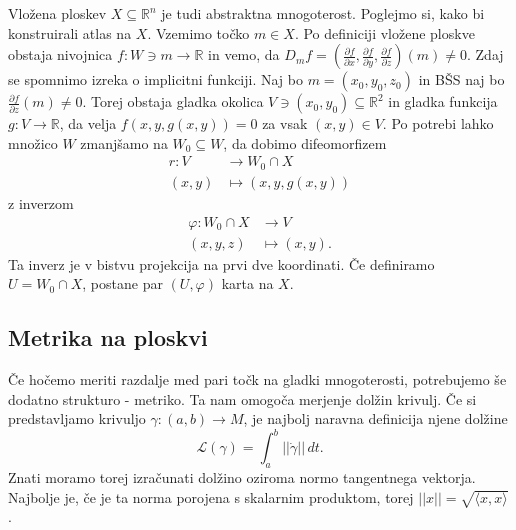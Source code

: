 \documentclass[10pt, a4paper]{article}
\begin{document}
Vložena ploskev $X \subseteq  \mathbb{R}^n$ je tudi abstraktna mnogoterost. Poglejmo si, kako bi konstruirali atlas na $X$. Vzemimo točko $m \in  X$. Po definiciji vložene ploskve obstaja nivojnica $f: W \ni m \to \mathbb{R}$ in vemo, da $D_mf = \left( \frac{ \partial f }{ \partial x } , \frac{ \partial f }{ \partial y }  , \frac{ \partial f }{ \partial z }  \right)\left( m \right) \neq 0$. Zdaj se spomnimo izreka o implicitni funkciji. Naj bo $m = \left( x_0, y_0 , z_0 \right)$ in BŠS naj bo $\frac{ \partial f }{ \partial z }\left( m \right) \neq 0$. Torej obstaja gladka okolica $V \ni \left( x_0, y_0 \right) \subseteq  \mathbb{R}^2$  in gladka funkcija $g: V \to \mathbb{R}$, da velja $f\left( x, y, g\left( x,y \right) \right) = 0$  za vsak $\left( x,y \right) \in  V$. Po potrebi lahko množico $W$ zmanjšamo na $W_0 \subseteq  W$, da dobimo difeomorfizem \begin{align*}
	r: V &\longrightarrow W_0 \cap  X \\
	\left( x,y \right) &\longmapsto \left( x,y,g\left( x,y \right) \right)
\end{align*} z inverzom \begin{align*}
	\varphi: W_0 \cap  X &\longrightarrow V \\
	\left( x,y,z \right) &\longmapsto \left( x,y \right).
\end{align*}Ta inverz je v bistvu projekcija na prvi dve koordinati. Če definiramo $U = W_0 \cap  X$, postane par $\left( U, \varphi \right)$  karta na $X$.  

\subsection{Metrika na ploskvi}%

Če hočemo meriti razdalje med pari točk na gladki mnogoterosti, potrebujemo še dodatno strukturo - metriko. Ta nam omogoča merjenje dolžin krivulj. Če si predstavljamo krivuljo $\gamma : \left( a,b \right) \to M$, je najbolj naravna definicija njene dolžine \[
\mathcal{L}\left( \gamma \right) = \int_{a}^{b} \lvert\lvert \dot{\gamma}  \rvert\rvert  \, dt. 
\]Znati moramo torej izračunati dolžino oziroma normo tangentnega vektorja. Najbolje je, če je ta norma porojena s skalarnim produktom, torej $\lvert\lvert x \rvert\rvert = \sqrt{\langle x,x \rangle } $.
\end{document}
